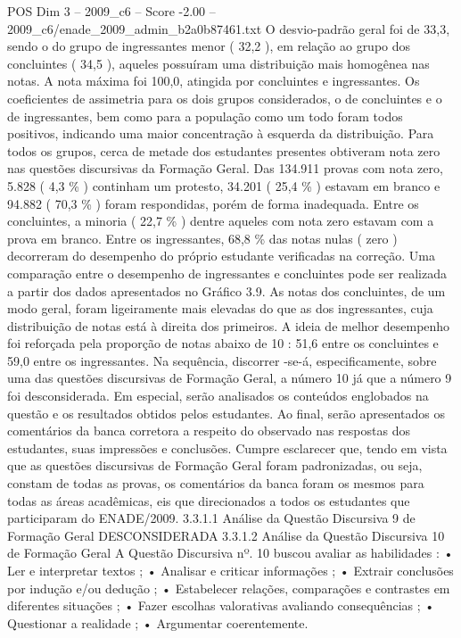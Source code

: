 \begin{textsample}{POS Dim 3 – 2009\_c6 – Score -2.00 – 2009\_c6/enade\_2009\_admin\_b2a0b87461.txt}
O desvio-padrão geral foi de 33,3, sendo o do grupo de ingressantes menor ( 32,2 ), em relação ao grupo dos concluintes ( 34,5 ), aqueles possuíram uma distribuição mais homogênea nas notas.
A nota máxima foi 100,0, atingida por concluintes e ingressantes.
Os coeficientes de assimetria para os dois grupos considerados, o de concluintes e o de ingressantes, bem como para a população como um todo foram todos positivos, indicando uma maior concentração à esquerda da distribuição.
Para todos os grupos, cerca de metade dos estudantes presentes obtiveram nota zero nas questões discursivas da Formação Geral.
Das 134.911 provas com nota zero, 5.828 ( 4,3 \% ) continham um protesto, 34.201 ( 25,4 \% ) estavam em branco e 94.882 ( 70,3 \% ) foram respondidas, porém de forma inadequada.
Entre os concluintes, a minoria ( 22,7 \% ) dentre aqueles com nota zero estavam com a prova em branco.
Entre os ingressantes, 68,8 \% das notas nulas ( zero ) decorreram do desempenho do próprio estudante verificadas na correção.
Uma comparação entre o desempenho de ingressantes e concluintes pode ser realizada a partir dos dados apresentados no Gráfico 3.9.
As notas dos concluintes, de um modo geral, foram ligeiramente mais elevadas do que as dos ingressantes, cuja distribuição de notas está à direita dos primeiros.
A ideia de melhor desempenho foi reforçada pela proporção de notas abaixo de 10 : 51,6 entre os concluintes e 59,0 entre os ingressantes.
Na sequência, discorrer -se-á, especificamente, sobre uma das questões discursivas de Formação Geral, a número 10 já que a número 9 foi desconsiderada.
Em especial, serão analisados os conteúdos englobados na questão e os resultados obtidos pelos estudantes.
Ao final, serão apresentados os comentários da banca corretora a respeito do observado nas respostas dos estudantes, suas impressões e conclusões.
Cumpre esclarecer que, tendo em vista que as questões discursivas de Formação Geral foram padronizadas, ou seja, constam de todas as provas, os comentários da banca foram os mesmos para todas as áreas acadêmicas, eis que direcionados a todos os estudantes que participaram do ENADE/2009. 3.3.1.1 Análise da Questão Discursiva 9 de Formação Geral DESCONSIDERADA 3.3.1.2 Análise da Questão Discursiva 10 de Formação Geral A Questão Discursiva nº. 10 buscou avaliar as habilidades : • Ler e interpretar textos ; • Analisar e criticar informações ; • Extrair conclusões por indução e/ou dedução ; • Estabelecer relações, comparações e contrastes em diferentes situações ; • Fazer escolhas valorativas avaliando consequências ; • Questionar a realidade ; • Argumentar coerentemente.

\end{textsample}
